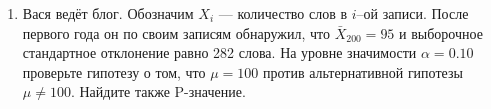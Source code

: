 \documentclass[pdftex,12pt,a4paper]{article}
\begin{document}
\begin{enumerate}
\item Вася ведёт блог. Обозначим $X_i$ --- количество слов в $i$--ой записи. После первого года он по своим записям обнаружил, что $\bar{X}_{200}=95$ и выборочное стандартное отклонение равно 282 слова. На уровне значимости $\alpha=0.10$ проверьте гипотезу о том, что $\mu=100$ против альтернативной гипотезы $\mu\neq 100$. Найдите также P-значение.


\end{enumerate}
\end{document}
